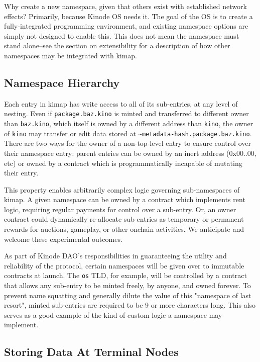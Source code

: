 \documentclass[runningheads]{llncs}
\begin{document}
Why create a new namespace, given that others exist with established network effects?
Primarily, because Kinode OS needs it.
The goal of the OS is to create a fully-integrated programming environment, and existing namespace options are simply not designed to enable this.
This does not mean the namespace must stand alone–see the section on \hyperref[sec:extensibility]{extensibility} for a description of how other namespaces may be integrated with kimap.

\subsection{Namespace Hierarchy}

Each entry in kimap has write access to all of its sub-entries, at any level of nesting.
Even if \verb|package.baz.kino| is minted and transferred to different owner than \verb|baz.kino|, which itself is owned by a different address than \verb|kino|, the owner of \verb|kino| may transfer or edit data stored at \verb|~metadata-hash.package.baz.kino|.
There are two ways for the owner of a non-top-level entry to ensure control over their namespace entry: parent entries can be owned by an inert address (0x00..00, etc) or owned by a contract which is programmatically incapable of mutating their entry.

This property enables arbitrarily complex logic governing sub-namespaces of kimap.
A given namespace can be owned by a contract which implements rent logic, requiring regular payments for control over a sub-entry.
Or, an owner contract could dynamically re-allocate sub-entries as temporary or permanent rewards for auctions, gameplay, or other onchain activities.
We anticipate and welcome these experimental outcomes.

As part of Kinode DAO's responsibilities in guaranteeing the utility and reliability of the protocol, certain namespaces will be given over to immutable contracts at launch.
The \verb|os| TLD, for example, will be controlled by a contract that allows any sub-entry to be minted freely, by anyone, and owned forever.
To prevent name squatting and generally dilute the value of this "namespace of last resort", minted sub-entries are required to be 9 or more characters long.
This also serves as a good example of the kind of custom logic a namespace may implement.

\subsection{Storing Data At Terminal Nodes}
\end{document}
